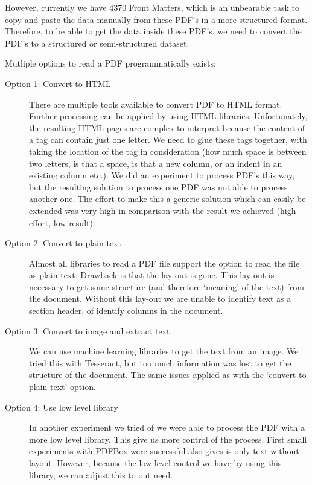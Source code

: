 \documentclass{ou-report}
\begin{document}
However, currently we have 4370 Front Matters, which is an unbearable task to 
copy and paste the data manually from these PDF's in a more structured format.
Therefore, to be able to get the data inside these PDF's, we need to convert 
the PDF's to a structured or semi-structured dataset.

Mutliple options to read a PDF programmatically exists:
\begin{description}
    \item[Option 1: Convert to HTML] There are multiple tools available to 
        convert PDF
        to HTML format. Further processing can be applied by using HTML
        libraries. Unfortunately, the resulting HTML pages are complex to
        interpret
        because the content of a  tag can contain just one letter. We need to 
        glue these 
        tags together, with taking the location of the tag in consideration
        (how much space is between two letters, is that a space, is that a 
        new column, or an indent in an existing column etc.). We did an 
        experiment to process PDF's this way, but the resulting solution to 
        process one PDF was not able to process another one. The effort to 
        make this a generic solution which can easily be extended was very high 
        in comparison with the result we achieved (high effort, low result).

    \item[Option 2: Convert to plain text] Almost all libraries to read a PDF 
        file 
        support the option to read the file as plain text. Drawback is that
        the lay-out is gone. This lay-out is necessary to get some structure
        (and therefore `meaning' of the text) from the document. Without this
        lay-out we are unable to identify text as a section header, of identify
        columns in the document.
    
    \item[Option 3: Convert to image and extract text] We can use machine 
        learning libraries to get the text from an image. We tried this 
        with Tesseract, but too much information was lost to get the 
        structure of the document. The same issues applied as with the `convert
        to plain text' option.

    \item[Option 4: Use low level library] In another experiment we tried of 
        we were able
        to process the PDF with a more low level library. This give us more
        control of the process. First small experiments with PDFBox were 
        successful also gives is only text without layout. However, because the
        low-level control we have by using this library, we can adjust this to
        out need.
\end{description}
\end{document}
